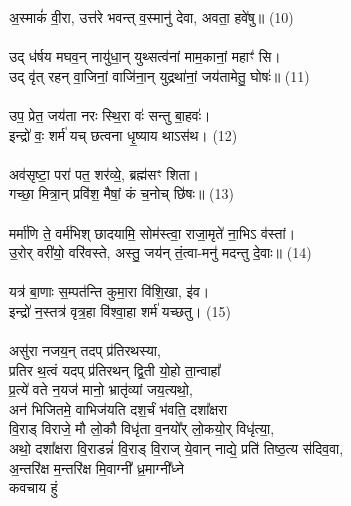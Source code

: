 अ॒स्माकं॑ वी॒रा, उत्त॑रे भवन्त् व॒स्मानु॑ देवा, अवता॒ हवे॑षु॥ (10)\\
\\
उद् ध॑र्षय मघव॒न् नायु॑धा॒न् युथ्सत्व॑नां माम॒कानां॒ महाꣳ॑ सि।\\
उद् वृ॑त् रहन् वा॒जिनां॒ वाजि॑ना॒न् युद्रथा॑नां॒ जय॑तामेतु॒ घोषः॑॥ (11)\\
\\
उप॒ प्रेत॒ जय॑ता नरः स्थि॒रा वः॑ सन्तु बा॒हवः॑।\\
इन्द्रो॑ वः॒ शर्म॑ यच् छत्वना धृ॒ष्याय थाऽस॑थ। (12)\\
\\
अव॑सृष्टा॒ परा॑ पत॒ शर॑व्ये॒, ब्रह्म॑सꣳ शिता।\\
गच्छा॒ मित्रा॒न् प्रवि॑श॒ मैषां॒ कं च॒नोच् छि॑षः॥ (13)\\
\\
मर्मा॑णि ते॒ वर्म॑भिश् छादयामि॒ सोम॑स्त्वा॒ राजा॒मृते॑ ना॒भिऽ व॑स्तां।\\
उ॒रोर् वरी॑यो॒ वरि॑वस्ते, अस्तु॒ जय॑न् तं॒त्वा-मनु॑ मदन्तु दे॒वाः॥ (14)\\
\\
यत्र॑ बा॒णाः स॒म्पत॑न्ति कुमा॒रा वि॑शि॒खा, इ॑व।\\
इन्द्रो॑ न॒स्तत्र॑ वृत्र॒हा वि॑श्वा॒हा शर्म॑ यच्छतु। (15)\\
\\
असु॑रा नजय॒न् तदप् प्र॑तिरथस्या, \\
प्रतिर थ॒त्वं यदप् प्र॑तिरथन् द्वि॒ती यो॒हो ता॒न्वाहा᳚ \\
प्र॒त्ये॑ वते न॒यज॑ मानो॒ भ्रातृ॑व्यां जय॒त्यथो॒,\\
अन॑ भिजितमे॒ वाभिज॑यति दश॒र्चं भ॑वति॒ दशा᳚क्षरा \\
वि॒राड् विराजे॒ मौ लो॒कौ विधृ॑ता व॒नयो᳚र् लो॒कयो॒र् विधृ॑त्या॒,\\
अथो॒ दशा᳚क्षरा वि॒राडन्नं॑ वि॒राड् वि॒राज् ये॒वान् नाद्ये॒ प्रति॑ तिष्ठ॒त्य स॑दिव॒वा,\\
अ॒न्तरि॑क्ष म॒न्तरि॑क्ष मि॒वाग्नी᳚ ध्र॒माग्नी᳚ध्ने\\
कवचाय हुं \\
\\

